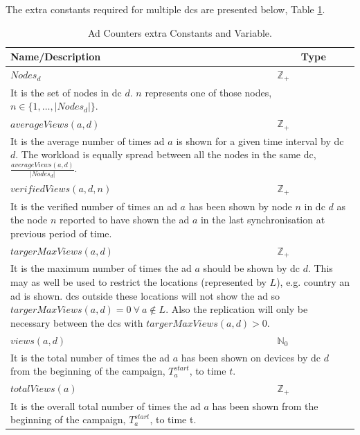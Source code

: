 The extra constants required for multiple \glspl{dc} are presented below, Table \ref{tab:ads_extra_constants_variables}.
\begin{table}[!ht]
	\begin{tabular}{|p{6.5cm}|p{.2cm}|}
		\hline
			Name/Description & \multicolumn{1}{c|}{Type} \\
		\hline
		\hline
			$Nodes_{d}$ & $\mathbb{Z}_{+}$ \\
		\hline
			\multicolumn{2}{|p{8.1cm}|}{It is the set of nodes in \gls{dc} $d$. $n$ represents one of those nodes, $n \in \{1,\dots, |Nodes_{d}|\}$.} \\
		\hline
		\hline
			$averageViews(a, d)$ & $\mathbb{Z}_{+}$ \\
		\hline
			\multicolumn{2}{|p{8.1cm}|}{It is the average number of times ad $a$ is shown for a given time interval by \gls{dc} $d$. The workload is equally spread between all the nodes in the same \gls{dc}, $\frac{averageViews(a, d)}{|Nodes_{d}|}$.} \\
		\hline
		\hline
			$verifiedViews(a, d, n)$ & $\mathbb{Z}_{+}$ \\
		\hline
			\multicolumn{2}{|p{8.1cm}|}{It is the verified number of times an ad $a$ has been shown by node $n$ in \gls{dc} $d$ as the node $n$ reported to have shown the ad $a$ in the last synchronisation at previous period of time.} \\
		\hline
		\hline
			$targerMaxViews(a, d)$ & $\mathbb{Z}_{+}$ \\
		\hline
			\multicolumn{2}{|p{8.1cm}|}{It is the maximum number of times the ad $a$ should be shown by \gls{dc} $d$. This may as well be used to restrict the locations (represented by $L$), e.g. country an ad is shown. \glspl{dc} outside these locations will not show the ad so $targerMaxViews(a, d) = 0 ~ \forall ~ a \not\in L$. Also the replication will only be necessary between the \glspl{dc} with $targerMaxViews(a, d) > 0$.} \\
		\hline
		\hline
			$views(a, d)$ & $\mathbb{N}_{0}$ \\
		\hline
			\multicolumn{2}{|p{8.1cm}|}{It is the total number of times the ad $a$ has been shown on devices by \gls{dc} $d$ from the beginning of the campaign, $T^{start}_{a}$, to time $t$.} \\
		\hline
		\hline
			$totalViews(a)$ & $\mathbb{Z}_{+}$ \\
		\hline
			\multicolumn{2}{|p{8.1cm}|}{It is the overall total number of times the ad $a$ has been shown from the beginning of the campaign, $T^{start}_{a}$, to time t.} \\
		\hline
	\end{tabular}

	\caption{Ad Counters extra Constants and Variable.}
	\label{tab:ads_extra_constants_variables}
\end{table}

